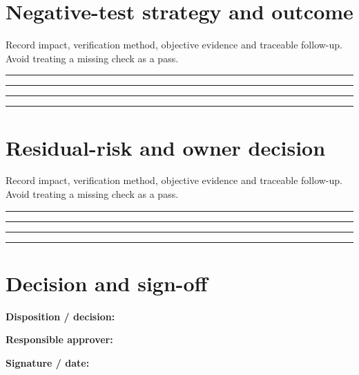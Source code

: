 \documentclass[10pt,letterpaper]{article}
\begin{document}
\section{Negative-test strategy and outcome}
Record impact, verification method, objective evidence and traceable follow-up. Avoid treating a missing check as a pass.\par\medskip
\noindent\rule{\linewidth}{0.4pt}\par\vspace{16pt}
\noindent\rule{\linewidth}{0.4pt}\par\vspace{16pt}
\noindent\rule{\linewidth}{0.4pt}\par\vspace{16pt}
\noindent\rule{\linewidth}{0.4pt}\par\vspace{16pt}
\section{Residual-risk and owner decision}
Record impact, verification method, objective evidence and traceable follow-up. Avoid treating a missing check as a pass.\par\medskip
\noindent\rule{\linewidth}{0.4pt}\par\vspace{16pt}
\noindent\rule{\linewidth}{0.4pt}\par\vspace{16pt}
\noindent\rule{\linewidth}{0.4pt}\par\vspace{16pt}
\noindent\rule{\linewidth}{0.4pt}\par\vspace{16pt}
\section{Decision and sign-off}
\noindent\textbf{Disposition / decision:}\quad\hrulefill\par\vspace{11pt}
\noindent\textbf{Responsible approver:}\quad\hrulefill\par\vspace{11pt}
\noindent\textbf{Signature / date:}\quad\hrulefill\par\vspace{11pt}
\end{document}
